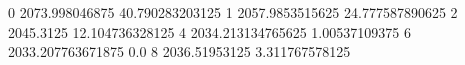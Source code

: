 0 2073.998046875 40.790283203125
1 2057.9853515625 24.777587890625
2 2045.3125 12.104736328125
4 2034.213134765625 1.00537109375
6 2033.207763671875 0.0
8 2036.51953125 3.311767578125
